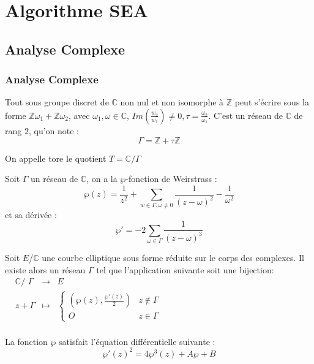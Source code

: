 \documentclass{beamer}
\begin{document}
\section{Algorithme SEA}
\subsection{Analyse Complexe}
\begin{frame}
\frametitle{Analyse Complexe}
\begin{definition}
Tout sous groupe discret de $\mathbb{C}$ non nul et non isomorphe à $\mathbb{Z}$ peut s'écrire sous la forme $\mathbb{Z}\omega_1 + \mathbb{Z}\omega_2$, avec $\omega_1, \omega \in \mathbb{C}$, $Im(\frac{w_2}{w_1}) \ne 0, \tau = \frac{\omega_2}{\omega_1}$. C'est un réseau de $\mathbb{C}$ de rang $2$, qu'on note :
$$\Gamma = \mathbb{Z} + \tau \mathbb{Z}$$
\end{definition}

\begin{definition}
On appelle tore le quotient $T=\mathbb{C} / \Gamma$
\end{definition}
\end{frame}

\begin{frame}
Soit $\Gamma$ un réseau de $\mathbb{C}$, on a la $\wp$-fonction de Weirstrass :
$$ \wp(z) = \frac{1}{z^2} + \sum_{w \in \Gamma, \omega \ne 0} \frac{1}{(z-\omega)^2} - \frac{1}{\omega^2} $$
et sa dérivée : 
$$ {\wp'} = -2 \sum_{\omega \in \Gamma} \frac{1}{(z-\omega)^3} $$
\begin{theorem}
Soit $E$/$\mathbb{C}$ une courbe elliptique sous forme réduite sur le corps des complexes. Il existe alors un réseau $\Gamma$ tel que l'application suivante soit une bijection:
\newline
$\begin{array}{cccc}
& \mathbb{C}\text{/ }\Gamma & \to & E \\
& z + \Gamma & \mapsto & \left\lbrace
\begin{array}{cc}
 (\wp(z), \frac{{\wp'}(z)}{2})  & z \notin \Gamma \\
 O & z \in \Gamma
\end{array}\right.\\
\end{array}$
\end{theorem}
La fonction $\wp$ satisfait l'équation différentielle suivante : 
\begin{equation*}
{\wp'}(z)^2 = 4\wp^3(z) + A \wp + B
\end{equation*}
\end{frame}
\end{document}
